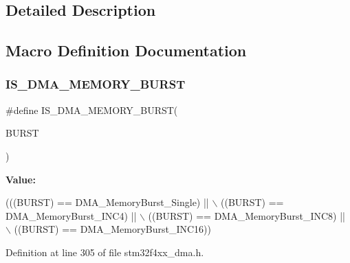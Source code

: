 \subsection{Detailed Description}


\subsection{Macro Definition Documentation}
\mbox{\label{group___d_m_a__memory__burst_ga921ebf06447dc036180fff50b7e4846a}} 
\subsubsection{\texorpdfstring{I\+S\+\_\+\+D\+M\+A\+\_\+\+M\+E\+M\+O\+R\+Y\+\_\+\+B\+U\+R\+ST}{IS\_DMA\_MEMORY\_BURST}}
{\footnotesize\ttfamily \#define I\+S\+\_\+\+D\+M\+A\+\_\+\+M\+E\+M\+O\+R\+Y\+\_\+\+B\+U\+R\+ST(\begin{DoxyParamCaption}\item[{}]{B\+U\+R\+ST }\end{DoxyParamCaption})}

{\bfseries Value\+:}
\begin{DoxyCode}
(((BURST) == DMA\_MemoryBurst\_Single) || \(\backslash\)
                                    ((BURST) == DMA\_MemoryBurst\_INC4)  || \(\backslash\)
                                    ((BURST) == DMA\_MemoryBurst\_INC8)  || \(\backslash\)
                                    ((BURST) == DMA\_MemoryBurst\_INC16))
\end{DoxyCode}


Definition at line 305 of file stm32f4xx\+\_\+dma.\+h.

